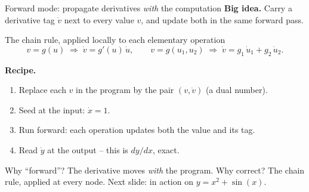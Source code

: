 \documentclass[aspectratio=169,11pt]{beamer}
\newcommand{\emphc}[1]{\textcolor{harvardcrimson}{#1}}
\begin{document}
\begin{frame}{Forward mode: propagate derivatives \emph{with} the computation}
\footnotesize
\textbf{Big idea.} Carry a \emphc{derivative tag} $\dot v$ next to every value $v$, and update both in the same forward pass.
\begin{block}{The chain rule, applied locally to each elementary operation}
\footnotesize
\[
v = g(u) \;\Rightarrow\; \dot v = g'(u)\,\dot u, \qquad
v = g(u_1,u_2) \;\Rightarrow\; \dot v = g_1\,\dot u_1 + g_2\,\dot u_2.
\]
\end{block}
\textbf{Recipe.}
\begin{enumerate}\itemsep1pt
\item Replace each $v$ in the program by the pair $(v, \dot v)$ (a \emphc{dual number}).
\item Seed at the input: $\dot x = 1$.
\item Run forward: each operation updates both the value and its tag.
\item Read $\dot y$ at the output -- this is $dy/dx$, exact.
\end{enumerate}
\emphc{Why ``forward''?} The derivative moves \emph{with} the program. \emphc{Why correct?} The chain rule, applied at every node. Next slide: in action on $y = x^2 + \sin(x)$.
\end{frame}
\end{document}
